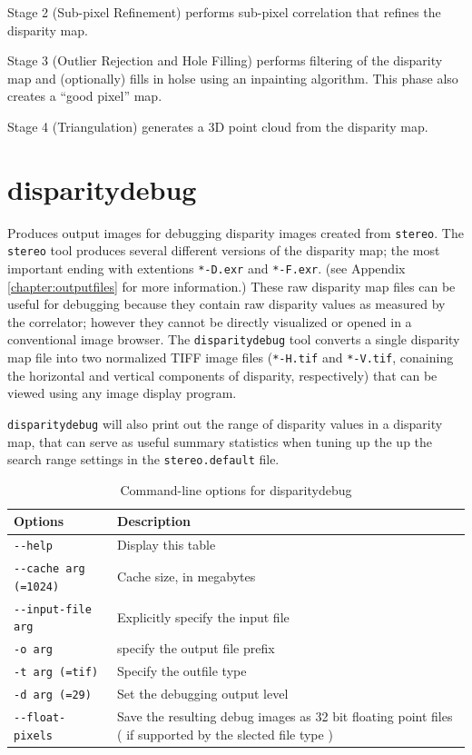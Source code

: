 Stage 2 (Sub-pixel Refinement) performs sub-pixel correlation that
refines the disparity map.

Stage 3 (Outlier Rejection and Hole Filling) performs filtering of the
disparity map and (optionally) fills in holse using an inpainting
algorithm.  This phase also creates a ``good pixel'' map.

Stage 4 (Triangulation) generates a 3D point cloud from the disparity
map.

\section{disparitydebug}
\label{disparitydebug}

Produces output images for debugging disparity images created from
\verb#stereo#. The {\tt stereo} tool produces several different
versions of the disparity map; the most important ending with
extentions \verb#*-D.exr# and \verb#*-F.exr#. (see Appendix
\ref{chapter:outputfiles} for more information.)  These raw disparity
map files can be useful for debugging because they contain raw
disparity values as measured by the correlator; however they cannot be
directly visualized or opened in a conventional image browser.  The
\verb#disparitydebug# tool converts a single disparity map file into
two normalized TIFF image files (\verb#*-H.tif# and \verb#*-V.tif#,
conaining the horizontal and vertical components of disparity,
respectively) that can be viewed using any image display program.

{\tt disparitydebug} will also print out the range of disparity values
in a disparity map, that can serve as useful summary statistics when
tuning up the up the search range settings in the {\tt stereo.default}
file.

\begin{longtable}{|l|p{10cm}|}
\caption{Command-line options for disparitydebug}
\label{tbl:disparitydebug}
\endfirsthead
\endhead
\endfoot
\endlastfoot
\hline
Options & Description \\ \hline \hline
\verb#--help# & Display this table \\ \hline
\verb#--cache arg (=1024)# & Cache size, in megabytes \\ \hline
\verb#--input-file arg# & Explicitly specify the input file \\ \hline
\verb#-o arg# & specify the output file prefix \\ \hline
\verb#-t arg (=tif)# & Specify the outfile type \\ \hline
\verb#-d arg (=29)# & Set the debugging output level \\ \hline
\verb#--float-pixels# & Save the resulting debug images as 32 bit floating point files ( if supported by the slected file type ) \\ \hline
\end{longtable}

